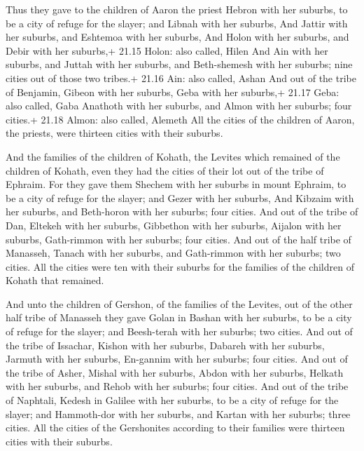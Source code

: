  Thus they gave to the children of Aaron the priest
Hebron with her suburbs, to be a city of refuge for the slayer; and
Libnah with her suburbs,  And Jattir with her suburbs, and
Eshtemoa with her suburbs,  And Holon with her suburbs, and
Debir with her suburbs,+ 21.15 Holon: also called, Hilen 
And Ain with her suburbs, and Juttah with her suburbs, and Beth-shemesh
with her suburbs; nine cities out of those two tribes.+ 21.16 Ain: also
called, Ashan  And out of the tribe of Benjamin, Gibeon
with her suburbs, Geba with her suburbs,+ 21.17 Geba: also called, Gaba
 Anathoth with her suburbs, and Almon with her suburbs;
four cities.+ 21.18 Almon: also called, Alemeth  All the
cities of the children of Aaron, the priests, were thirteen cities with
their suburbs.

 And the families of the children of Kohath, the Levites
which remained of the children of Kohath, even they had the cities of
their lot out of the tribe of Ephraim.  For they gave them
Shechem with her suburbs in mount Ephraim, to be a city of refuge for
the slayer; and Gezer with her suburbs,  And Kibzaim with
her suburbs, and Beth-horon with her suburbs; four cities. 
And out of the tribe of Dan, Eltekeh with her suburbs, Gibbethon with
her suburbs,  Aijalon with her suburbs, Gath-rimmon with
her suburbs; four cities.  And out of the half tribe of
Manasseh, Tanach with her suburbs, and Gath-rimmon with her suburbs; two
cities.  All the cities were ten with their suburbs for the
families of the children of Kohath that remained.

 And unto the children of Gershon, of the families of the
Levites, out of the other half tribe of Manasseh they gave Golan in
Bashan with her suburbs, to be a city of refuge for the slayer; and
Beesh-terah with her suburbs; two cities.  And out of the
tribe of Issachar, Kishon with her suburbs, Dabareh with her suburbs,
 Jarmuth with her suburbs, En-gannim with her suburbs; four
cities.  And out of the tribe of Asher, Mishal with her
suburbs, Abdon with her suburbs,  Helkath with her suburbs,
and Rehob with her suburbs; four cities.  And out of the
tribe of Naphtali, Kedesh in Galilee with her suburbs, to be a city of
refuge for the slayer; and Hammoth-dor with her suburbs, and Kartan with
her suburbs; three cities.  All the cities of the
Gershonites according to their families were thirteen cities with their
suburbs.

